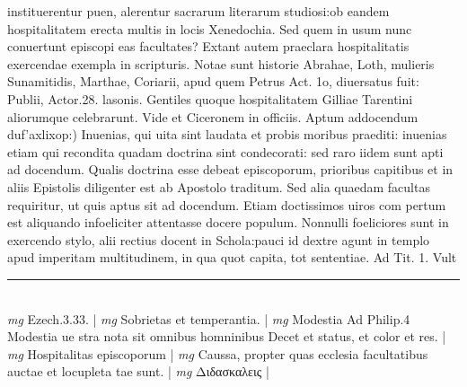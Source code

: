 \documentclass{article}
\begin{document}
\begin{pages}
instituerentur puen, alerentur sacrarum literarum studiosi:ob eandem hospitalitatem erecta multis in locis Xenedochia. Sed quem in usum nunc conuertunt episcopi eas facultates? Extant autem praeclara hospitalitatis exercendae exempla in scripturis. Notae sunt historie Abrahae, Loth, mulieris Sunamitidis, Marthae, Coriarii, apud quem Petrus Act. 1o, diuersatus fuit: Publii, Actor.28. lasonis. Gentiles quoque hospitalitatem Gilliae Tarentini aliorumque celebrarunt. Vide et Ciceronem in officiis.  \pend\pstart Aptum addocendum duf'axlixop:) Inuenias, qui uita sint laudata et probis moribus praediti: inuenias etiam qui recondita quadam doctrina sint condecorati: sed raro iidem sunt apti ad docendum. Qualis doctrina esse debeat episcoporum, prioribus capitibus et in aliis Epistolis diligenter est ab Apostolo traditum. Sed alia quaedam facultas requiritur, ut quis aptus sit ad docendum. Etiam doctissimos uiros com pertum est aliquando infoeliciter attentasse docere populum. Nonnulli foeliciores sunt in exercendo stylo, alii rectius docent in Schola:pauci id dextre agunt in templo apud imperitam multitudinem, in qua quot capita, tot sententiae. Ad Tit. 1. Vult  \pend
\vspace{0.5cm}\noindent
\vspace{0.2cm}\rule{1cm}{0.2pt}\\ 
\hspace{0.2cm}\textit{mg}
\footnotesize Ezech.3.33. 
\normalsize| 
\hspace{0.2cm}\textit{mg}
\footnotesize Sobrietas et temperantia. 
\normalsize| 
\hspace{0.2cm}\textit{mg}
\footnotesize Modestia Ad Philip.4 Modestia ue stra nota sit omnibus homninibus Decet et status, et color et res. 
\normalsize| 
\hspace{0.2cm}\textit{mg}
\footnotesize Hospitalitas episcoporum 
\normalsize| 
\hspace{0.2cm}\textit{mg}
\footnotesize Caussa, propter quas ecclesia facultatibus auctae et locupleta tae sunt. 
\normalsize| 
\hspace{0.2cm}\textit{mg}
\footnotesize Διδασκαλεις 
\normalsize| 

\end{pages}
\end{document}

